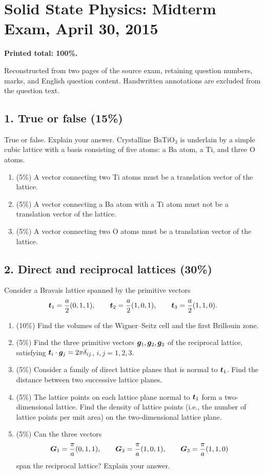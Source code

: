\chapter{Solid State Physics: Midterm Exam, April 30, 2015}
\label{q:physics-2015-04-midterm}
\begingroup
\setlength{\parskip}{0.35em}
\textbf{Printed total: 100\%.}
\begin{sourceNote}
Reconstructed from two pages of the source exam, retaining question numbers, marks, and English question content. Handwritten annotations are excluded from the question text.
\end{sourceNote}

\section*{1. True or false (15\%)}
True or false. Explain your answer.
Crystalline BaTiO$_3$ is underlain by a simple cubic lattice with a basis consisting of five atoms: a Ba atom, a Ti, and three O atoms.
\begin{enumerate}[label=(\alph*)]
\item (5\%) A vector connecting two Ti atoms must be a translation vector of the lattice.
\item (5\%) A vector connecting a Ba atom with a Ti atom must not be a translation vector of the lattice.
\item (5\%) A vector connecting two O atoms must be a translation vector of the lattice.
\end{enumerate}

\section*{2. Direct and reciprocal lattices (30\%)}
Consider a Bravais lattice spanned by the primitive vectors
\[
\boldsymbol{t}_1=\frac a2(0,1,1),\qquad
\boldsymbol{t}_2=\frac a2(1,0,1),\qquad
\boldsymbol{t}_3=\frac a2(1,1,0).
\]
\begin{enumerate}[label=(\alph*)]
\item (10\%) Find the volumes of the Wigner--Seitz cell and the first Brillouin zone.
\item (5\%) Find the three primitive vectors $\boldsymbol{g}_1,\boldsymbol{g}_2,\boldsymbol{g}_3$ of the reciprocal lattice, satisfying
$\boldsymbol{t}_i\cdot\boldsymbol{g}_j=2\pi\delta_{ij}$, $i,j=1,2,3$.
\item (5\%) Consider a family of direct lattice planes that is normal to $\boldsymbol{t}_1$. Find the distance between two successive lattice planes.
\item (5\%) The lattice points on each lattice plane normal to $\boldsymbol{t}_1$ form a two-dimensional lattice. Find the density of lattice points (i.e., the number of lattice points per unit area) on the two-dimensional lattice plane.
\item (5\%) Can the three vectors
\[
\boldsymbol{G}_1=\frac\pi a(0,1,1),\qquad
\boldsymbol{G}_2=\frac\pi a(1,0,1),\qquad
\boldsymbol{G}_3=\frac\pi a(1,1,0)
\]
span the reciprocal lattice? Explain your answer.
\end{enumerate}

